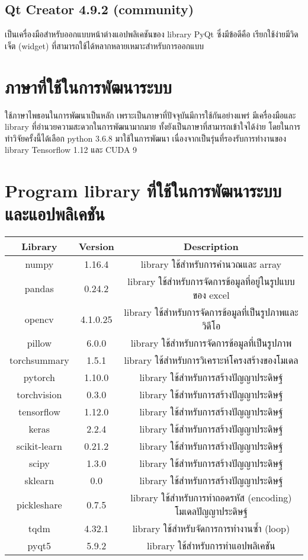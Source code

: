 \subsection*{Qt Creator 4.9.2 (community)}
เป็นเครื่องมือสำหรับออกแบบหน้าต่างแอปพลิเคชันของ library PyQt ซึ่งมีข้อดีคือ เรียกใช้ง่ายมีวิดเจ็ต (widget) ที่สามารถใช้ได้หลากหลายเหมาะสำหรับการออกแบบ

\clearpage
\section{ภาษาที่ใช้ในการพัฒนาระบบ} 
	ใช้ภาษาไพธอนในการพัฒนาเป็นหลัก เพราะเป็นภาษาที่ปัจจุบันมีการใช้กันอย่างแพร่ มีเครื่องมือและ library ที่อำนวยความสะดวกในการพัฒนามากมาย 
	ทั้งยังเป็นภาษาที่สามารถเข้าใจได้ง่าย โดยในการทำวิจัยครั้งนี้ได้เลือก python 3.6.8 มาใช้ในการพัฒนา 
	เนื่องจากเป็นรุ่นที่รองรับการทำงานของ library Tensorflow 1.12 และ CUDA 9
\vspace{3mm}
\section{Program library ที่ใช้ในการพัฒนาระบบและแอปพลิเคชัน} 
\begin{tabular}{|c|c|c|}
		\hline
		{Library}&{Version}&{Description}\\
		\hline
		numpy	 			& 1.16.4		& library ใช้สำหรับการคำนวณและ array			\\
		pandas				& 0.24.2		& library ใช้สำหรับการจัดการข้อมูลที่อยู่ในรูปแบบของ excel				\\
		opencv			 	& 4.1.0.25		& library ใช้สำหรับการจัดการข้อมูลที่เป็นรูปภาพและวิดีโอ		\\
		pillow				& 6.0.0			& library ใช้สำหรับการจัดการข้อมูลที่เป็นรูปภาพ			\\
		torchsummary		& 1.5.1			& library ใช้สำหรับการวิเคราะห์โครงสร้างของโมเดล 							\\
		pytorch		 		& 1.10.0		& library ใช้สำหรับการสร้างปัญญาประดิษฐ์							\\
		torchvision			& 0.3.0	 		& library ใช้สำหรับการสร้างปัญญาประดิษฐ์							\\
		tensorflow			& 1.12.0			& library ใช้สำหรับการสร้างปัญญาประดิษฐ์							\\
		keras				& 2.2.4			& library ใช้สำหรับการสร้างปัญญาประดิษฐ์							\\
		scikit-learn		& 0.21.2		& library ใช้สำหรับการสร้างปัญญาประดิษฐ์							\\
		scipy				& 1.3.0			& library ใช้สำหรับการสร้างปัญญาประดิษฐ์							\\
		sklearn				& 0.0			& library ใช้สำหรับการสร้างปัญญาประดิษฐ์							\\
		pickleshare			& 0.7.5			& library ใช้สำหรับการทำถอดรหัส (encoding) โมเดลปัญญาประดิษฐ์			\\
		tqdm				& 4.32.1		& library ใช้สำหรับจัดการการทำงานซ้ำ (loop)					\\
		pyqt5				& 5.9.2			& library ใช้สำหรับการทำแอปพลิเคชัน					\\
		\hline
\end{tabular}

